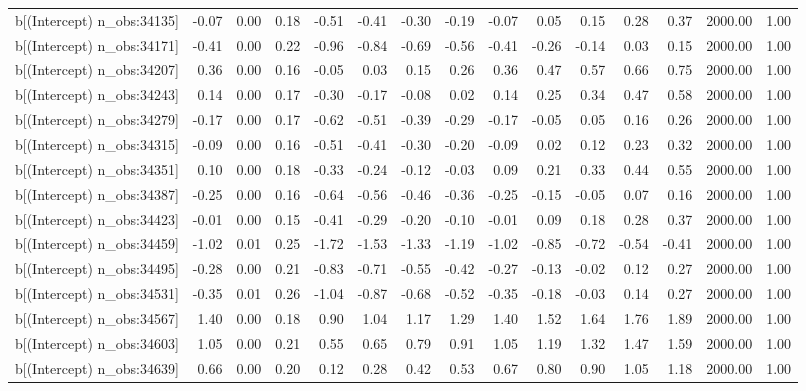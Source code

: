 \begin{table}[ht]
\begin{tabular}{rrrrrrrrrrrrrrr}
  b[(Intercept) n\_obs:34135] & -0.07 & 0.00 & 0.18 & -0.51 & -0.41 & -0.30 & -0.19 & -0.07 & 0.05 & 0.15 & 0.28 & 0.37 & 2000.00 & 1.00 \\ 
  b[(Intercept) n\_obs:34171] & -0.41 & 0.00 & 0.22 & -0.96 & -0.84 & -0.69 & -0.56 & -0.41 & -0.26 & -0.14 & 0.03 & 0.15 & 2000.00 & 1.00 \\ 
  b[(Intercept) n\_obs:34207] & 0.36 & 0.00 & 0.16 & -0.05 & 0.03 & 0.15 & 0.26 & 0.36 & 0.47 & 0.57 & 0.66 & 0.75 & 2000.00 & 1.00 \\ 
  b[(Intercept) n\_obs:34243] & 0.14 & 0.00 & 0.17 & -0.30 & -0.17 & -0.08 & 0.02 & 0.14 & 0.25 & 0.34 & 0.47 & 0.58 & 2000.00 & 1.00 \\ 
  b[(Intercept) n\_obs:34279] & -0.17 & 0.00 & 0.17 & -0.62 & -0.51 & -0.39 & -0.29 & -0.17 & -0.05 & 0.05 & 0.16 & 0.26 & 2000.00 & 1.00 \\ 
  b[(Intercept) n\_obs:34315] & -0.09 & 0.00 & 0.16 & -0.51 & -0.41 & -0.30 & -0.20 & -0.09 & 0.02 & 0.12 & 0.23 & 0.32 & 2000.00 & 1.00 \\ 
  b[(Intercept) n\_obs:34351] & 0.10 & 0.00 & 0.18 & -0.33 & -0.24 & -0.12 & -0.03 & 0.09 & 0.21 & 0.33 & 0.44 & 0.55 & 2000.00 & 1.00 \\ 
  b[(Intercept) n\_obs:34387] & -0.25 & 0.00 & 0.16 & -0.64 & -0.56 & -0.46 & -0.36 & -0.25 & -0.15 & -0.05 & 0.07 & 0.16 & 2000.00 & 1.00 \\ 
  b[(Intercept) n\_obs:34423] & -0.01 & 0.00 & 0.15 & -0.41 & -0.29 & -0.20 & -0.10 & -0.01 & 0.09 & 0.18 & 0.28 & 0.37 & 2000.00 & 1.00 \\ 
  b[(Intercept) n\_obs:34459] & -1.02 & 0.01 & 0.25 & -1.72 & -1.53 & -1.33 & -1.19 & -1.02 & -0.85 & -0.72 & -0.54 & -0.41 & 2000.00 & 1.00 \\ 
  b[(Intercept) n\_obs:34495] & -0.28 & 0.00 & 0.21 & -0.83 & -0.71 & -0.55 & -0.42 & -0.27 & -0.13 & -0.02 & 0.12 & 0.27 & 2000.00 & 1.00 \\ 
  b[(Intercept) n\_obs:34531] & -0.35 & 0.01 & 0.26 & -1.04 & -0.87 & -0.68 & -0.52 & -0.35 & -0.18 & -0.03 & 0.14 & 0.27 & 2000.00 & 1.00 \\ 
  b[(Intercept) n\_obs:34567] & 1.40 & 0.00 & 0.18 & 0.90 & 1.04 & 1.17 & 1.29 & 1.40 & 1.52 & 1.64 & 1.76 & 1.89 & 2000.00 & 1.00 \\ 
  b[(Intercept) n\_obs:34603] & 1.05 & 0.00 & 0.21 & 0.55 & 0.65 & 0.79 & 0.91 & 1.05 & 1.19 & 1.32 & 1.47 & 1.59 & 2000.00 & 1.00 \\ 
  b[(Intercept) n\_obs:34639] & 0.66 & 0.00 & 0.20 & 0.12 & 0.28 & 0.42 & 0.53 & 0.67 & 0.80 & 0.90 & 1.05 & 1.18 & 2000.00 & 1.00 \\ 

\end{tabular}
\end{table}
